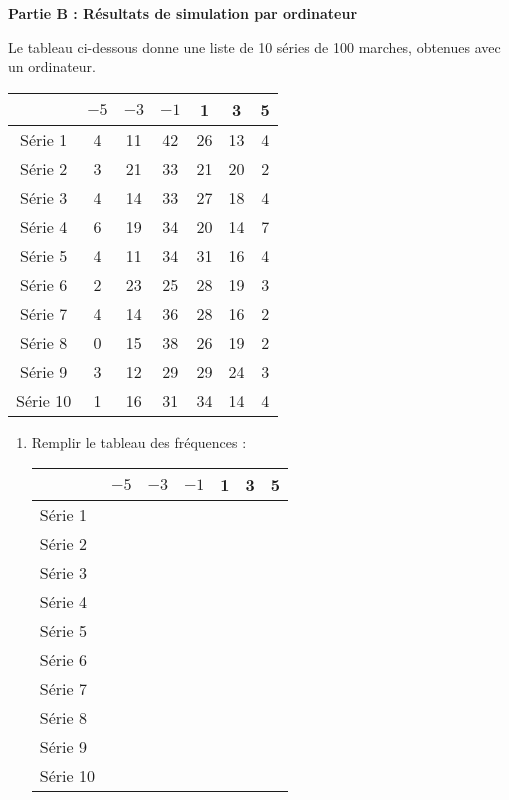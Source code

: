 \begin{act}
\begin{figure}[p]
\begin{tabular}{cc}
\end{tabular}
\end{figure}
\FloatBarrier

\noindent \textbf{Partie B : R\'esultats de simulation par ordinateur}

Le tableau ci-dessous donne une liste de 10 s\'eries de 100 marches, obtenues avec un ordinateur.

\begin{center}
\begin{tabular}{|*{7}{c|}}\hline
 & $-5$ & $-3$ & $-1$ & 1 & 3 & 5 \\ \hline\hline
 S\'erie 1 &4&11&42&26&13&4 \\ \hline
 S\'erie 2 &3&21&33&21&20&2 \\ \hline
 S\'erie 3 &4&14&33&27&18&4 \\ \hline
 S\'erie 4 &6&19&34&20&14&7 \\ \hline
 S\'erie 5 &4&11&34&31&16&4 \\ \hline
 S\'erie 6 &2&23&25&28&19&3 \\ \hline
 S\'erie 7 &4&14&36&28&16&2 \\ \hline
 S\'erie 8 &0&15&38&26&19&2 \\ \hline
 S\'erie 9 &3&12&29&29&24&3 \\ \hline
 S\'erie 10 &1&16&31&34&14&4 \\ \hline
\end{tabular}
\end{center}

\begin{enumerate}
	\item Remplir le tableau des fr\'equences :

	\begin{center}
\begin{tabular}{|*{7}{m{1.5cm}|}}\hline
 & $-5$ & $-3$ & $-1$ & 1 & 3 & 5 \\ \hline\hline
 S\'erie 1 &&&&&& \\ \hline
 S\'erie 2 &&&&&& \\ \hline
 S\'erie 3 &&&&&& \\ \hline
 S\'erie 4 &&&&&& \\ \hline
 S\'erie 5 &&&&&& \\ \hline
 S\'erie 6 &&&&&& \\ \hline
 S\'erie 7 &&&&&& \\ \hline
 S\'erie 8 &&&&&& \\ \hline
 S\'erie 9 &&&&&& \\ \hline
 S\'erie 10 &&&&&& \\ \hline
\end{tabular}
\end{center}


\end{enumerate}
\end{act}

